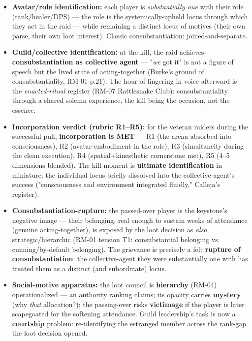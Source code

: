 \documentclass[11pt]{report}
\begin{document}
\begin{itemize}
\item \textbf{Avatar/role identification:} each player is \textit{substantially one} with their role (tank/healer/DPS) — the role is the systemically-upheld locus through which they act in the raid — while remaining a distinct locus of motives (their own parse, their own loot interest). Classic consubstantiation: joined-and-separate.
\item \textbf{Guild/collective identification:} at the kill, the raid achieves \textbf{consubstantiation as collective agent} — "\textit{we} got it" is not a figure of speech but the lived state of acting-together (Burke's ground of consubstantiality, RM-01 p.21). The hour of lingering in voice afterward is the \textit{enacted-ritual} register (RM-07 Rattlesnake Club): consubstantiality through a shared solemn experience, the kill being the occasion, not the essence.
\item \textbf{Incorporation verdict (rubric R1–R5):} for the veteran raiders during the successful pull, \textbf{incorporation is MET} — R1 (the arena absorbed into consciousness), R2 (avatar-embodiment in the role), R3 (simultaneity during the clean execution), R4 (spatial+kinesthetic cornerstone met), R5 (4–5 dimensions blended). The kill-moment is \textbf{ultimate identification} in miniature: the individual locus briefly dissolved into the collective-agent's success ("consciousness and environment integrated fluidly," Calleja's register).
\item \textbf{Consubstantiation-rupture:} the passed-over player is the keystone's negative image — their belonging, real enough to sustain weeks of attendance (genuine acting-together), is exposed by the loot decision as \textit{also} strategic/hierarchic (RM-01 tension T1: consubstantial belonging vs. cunning/by-default belonging). The grievance is precisely a felt \textbf{rupture of consubstantiation}: the collective-agent they were substantially one with has treated them as a distinct (and subordinate) locus.
\item \textbf{Social-motive apparatus:} the loot council is \textbf{hierarchy} (RM-04) operationalized — an authority ranking claims; its opacity carries \textbf{mystery} (why \textit{that} allocation?); the passing-over risks \textbf{victimage} if the player is later scapegoated for the softening attendance. Guild leadership's task is now a \textbf{courtship} problem: re-identifying the estranged member across the rank-gap the loot decision opened.
\end{itemize}
\end{document}
